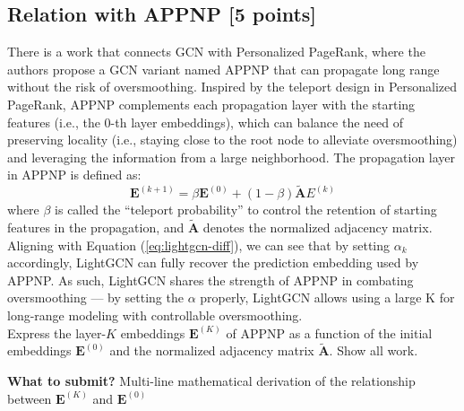\documentclass[11pt]{article}
\begin{document}
 \subsection{Relation with APPNP [5 points]}
There is a work that connects GCN with Personalized PageRank, where the authors propose a GCN variant named APPNP that can propagate long range without the risk of oversmoothing. Inspired by the teleport design in Personalized PageRank, APPNP complements each propagation layer with the starting features (i.e., the 0-th layer embeddings), which can balance the need of preserving locality (i.e., staying close to the root node to alleviate oversmoothing) and leveraging the information from a large neighborhood. The propagation layer in APPNP is defined as:
$$\mathbf{E}^{(k+1)} = \beta\mathbf{E}^{(0)}+(1-\beta)\tilde{\mathbf{A}}E^{(k)}$$
where $\beta$ is called the ``teleport probability'' to control the retention of starting features in the propagation, and $\tilde{\mathbf{A}}$ denotes the normalized adjacency matrix.\\

\noindent Aligning with Equation (\ref{eq:lightgcn-diff}), we can see that by setting $\alpha_k$ accordingly, LightGCN can fully recover the prediction embedding
used by APPNP. As such, LightGCN shares the strength of APPNP in combating oversmoothing — by setting the $\alpha$ properly, LightGCN allows using a large K for long-range modeling with controllable oversmoothing.\\

\noindent Express the layer-$K$ embeddings $\mathbf{E}^{(K)}$ of APPNP as a function of the initial embeddings $\mathbf{E}^{(0)}$ and the normalized adjacency matrix $\tilde{\mathbf{A}}$. Show all work.

 \textbf{What to submit?} Multi-line mathematical derivation of the relationship between $\mathbf{E}^{(K)}$ and $\mathbf{E}^{(0)}$
\end{document}
